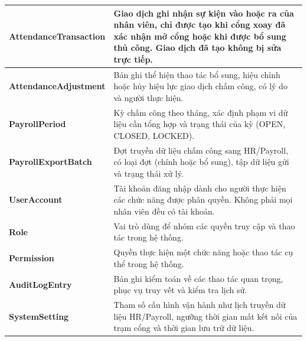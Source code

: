 \begin{longtable}{|>{\raggedright\arraybackslash}m{4.5cm}|>{\raggedright\arraybackslash}m{11cm}|}
    \textbf{AttendanceTransaction} & Giao dịch ghi nhận sự kiện vào hoặc ra của nhân viên, chỉ được tạo khi cổng xoay đã xác nhận mở cổng hoặc khi được bổ sung thủ công. Giao dịch đã tạo không bị sửa trực tiếp.\\
    \hline
    \textbf{AttendanceAdjustment} & Bản ghi thể hiện thao tác bổ sung, hiệu chỉnh hoặc hủy hiệu lực giao dịch chấm công, có lý do và người thực hiện.\\
    \hline
    \textbf{PayrollPeriod} & Kỳ chấm công theo tháng, xác định phạm vi dữ liệu cần tổng hợp và trạng thái của kỳ (OPEN, CLOSED, LOCKED).\\
    \hline
    \textbf{PayrollExportBatch} & Đợt truyền dữ liệu chấm công sang HR/Payroll, có loại đợt (chính hoặc bổ sung), tập dữ liệu gửi và trạng thái xử lý.\\
    \hline
    \textbf{UserAccount} & Tài khoản đăng nhập dành cho người thực hiện các chức năng được phân quyền. Không phải mọi nhân viên đều có tài khoản.\\
    \hline
    \textbf{Role} & Vai trò dùng để nhóm các quyền truy cập và thao tác trong hệ thống.\\
    \hline
    \textbf{Permission} & Quyền thực hiện một chức năng hoặc thao tác cụ thể trong hệ thống.\\
    \hline
    \textbf{AuditLogEntry} & Bản ghi kiểm toán về các thao tác quan trọng, phục vụ truy vết và kiểm tra lịch sử.\\
    \hline
    \textbf{SystemSetting} & Tham số cấu hình vận hành như lịch truyền dữ liệu HR/Payroll, ngưỡng thời gian mất kết nối của trạm cổng và thời gian lưu trữ dữ liệu.\\
    \hline
\end{longtable}
\endgroup

